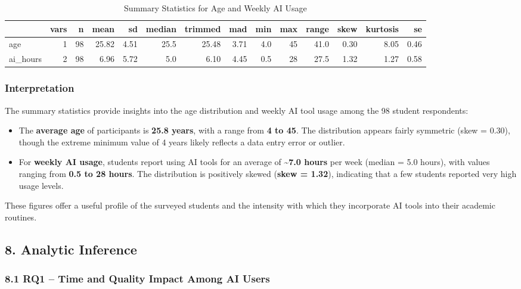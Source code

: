 \documentclass[
]{article}
\providecommand{\tightlist}{%
  \setlength{\itemsep}{0pt}\setlength{\parskip}{0pt}}
\begin{document}
\begin{longtable}[t]{lrrrrrrrrrrrrr}
\caption{\label{tab:descriptive-stats}Summary Statistics for Age and Weekly AI Usage}\\
\toprule
 & vars & n & mean & sd & median & trimmed & mad & min & max & range & skew & kurtosis & se\\
\midrule
age & 1 & 98 & 25.82 & 4.51 & 25.5 & 25.48 & 3.71 & 4.0 & 45 & 41.0 & 0.30 & 8.05 & 0.46\\
ai\_hours & 2 & 98 & 6.96 & 5.72 & 5.0 & 6.10 & 4.45 & 0.5 & 28 & 27.5 & 1.32 & 1.27 & 0.58\\
\bottomrule
\end{longtable}

\subsubsection{Interpretation}\label{interpretation}

The summary statistics provide insights into the age distribution and
weekly AI tool usage among the 98 student respondents:

\begin{itemize}
\tightlist
\item
  The \textbf{average age} of participants is \textbf{25.8 years}, with
  a range from \textbf{4 to 45}. The distribution appears fairly
  symmetric (skew = 0.30), though the extreme minimum value of 4 years
  likely reflects a data entry error or outlier.
\item
  For \textbf{weekly AI usage}, students report using AI tools for an
  average of \textbf{\textasciitilde7.0 hours} per week (median = 5.0
  hours), with values ranging from \textbf{0.5 to 28 hours}. The
  distribution is positively skewed (\textbf{skew = 1.32}), indicating
  that a few students reported very high usage levels.
\end{itemize}

These figures offer a useful profile of the surveyed students and the
intensity with which they incorporate AI tools into their academic
routines.

\subsection{8. Analytic Inference}\label{analytic-inference}

\subsubsection{8.1 RQ1 -- Time and Quality Impact Among AI
Users}\label{rq1-time-and-quality-impact-among-ai-users}
\end{document}
